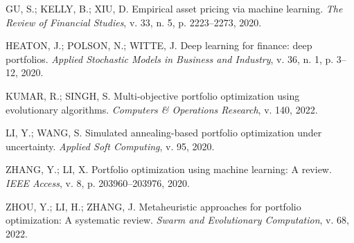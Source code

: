 ﻿\documentclass[
  12pt,
  oneside,
  a4paper,
  brazil
]{abntex2}
\begin{document}
GU, S.; KELLY, B.; XIU, D. Empirical asset pricing via machine learning. \textit{The Review of Financial Studies}, v. 33, n. 5, p. 2223--2273, 2020.

HEATON, J.; POLSON, N.; WITTE, J. Deep learning for finance: deep portfolios. \textit{Applied Stochastic Models in Business and Industry}, v. 36, n. 1, p. 3--12, 2020.

KUMAR, R.; SINGH, S. Multi-objective portfolio optimization using evolutionary algorithms. \textit{Computers \& Operations Research}, v. 140, 2022.

LI, Y.; WANG, S. Simulated annealing-based portfolio optimization under uncertainty. \textit{Applied Soft Computing}, v. 95, 2020.

ZHANG, Y.; LI, X. Portfolio optimization using machine learning: A review. \textit{IEEE Access}, v. 8, p. 203960--203976, 2020.

ZHOU, Y.; LI, H.; ZHANG, J. Metaheuristic approaches for portfolio optimization: A systematic review. \textit{Swarm and Evolutionary Computation}, v. 68, 2022.
\end{document}
